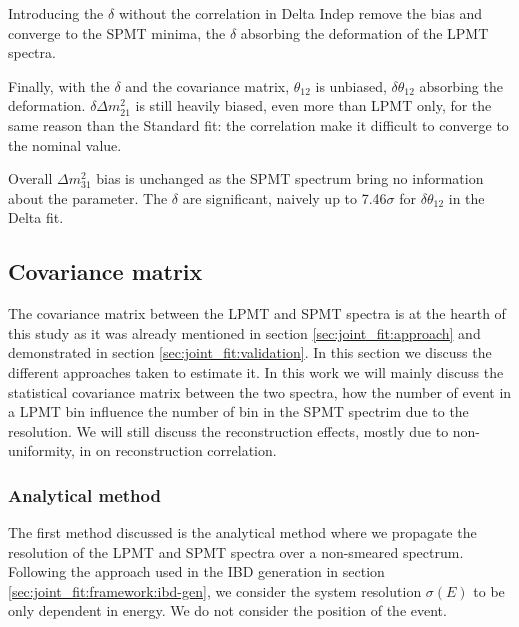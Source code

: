 \documentclass[../main.tex]{subfiles}
\begin{document}
Introducing the $\delta$ without the correlation in Delta Indep remove the bias and converge to the SPMT minima, the $\delta$ absorbing the deformation of the LPMT spectra.

Finally, with the $\delta$ and the covariance matrix, $\theta_{12}$ is unbiased, $\delta \theta_{12}$ absorbing the deformation. $\delta \Delta m^2_{21}$ is still heavily biased, even more than LPMT only, for the same reason than the Standard fit: the correlation make it difficult to converge to the nominal value.

Overall $\Delta m^2_{31}$ bias is unchanged as the SPMT spectrum bring no information about the parameter. The $\delta$ are significant, naively up to 7.46$\sigma$ for $\delta \theta_{12}$ in the Delta fit.




%
%
\subsection{Covariance matrix}
\label{sec:joint_fit:cov_mat}

The covariance matrix between the LPMT and SPMT spectra is at the hearth of this study as it was already mentioned in section \ref{sec:joint_fit:approach} and demonstrated in section \ref{sec:joint_fit:validation}. In this section we discuss the different approaches taken to estimate it. In this work we will mainly discuss the statistical covariance matrix between the two spectra, how the number of event in a LPMT bin influence the number of bin in the SPMT spectrim due to the resolution. We will still discuss the reconstruction effects, mostly due to non-uniformity, in on reconstruction correlation.

\subsubsection{Analytical method}

The first method discussed is the analytical method where we propagate the resolution of the LPMT and SPMT spectra over a non-smeared spectrum. Following the approach used in the IBD generation in section \ref{sec:joint_fit:framework:ibd-gen}, we consider the system resolution $\sigma(E)$ to be only dependent in energy. We do not consider the position of the event.
\end{document}
